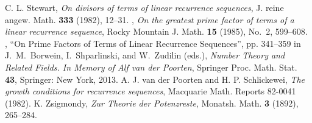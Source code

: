 \documentclass[reqno]{amsart}
\theoremstyle{remark}
\begin{document}
\begin{thebibliography}{99}
%
 C. L. Stewart, \textit{On divisors of terms of linear recurrence sequences}, J. reine angew. Math. \textbf{333} (1982), 12--31.
%
 \bysame, \textit{On the greatest prime factor of terms of a linear recurrence sequence}, Rocky Mountain J. Math. \textbf{15} (1985), No.~2, 599--608.
%
 \bysame, ``On Prime Factors of Terms of Linear Recurrence Sequences'', pp. 341--359 in J.~M.~Borwein, I.~Shparlinski, and W.~Zudilin (eds.), \textit{Number Theory and Related Fields. In Memory of Alf van der Poorten}, Springer Proc. Math. Stat. \textbf{43}, Springer: New York, 2013.
%
 A. J. van der Poorten and H. P. Schlickewei, \textit{The growth conditions for recurrence sequences}, Macquarie Math. Reports 82-0041 (1982).
%
 K. Zsigmondy, \emph{Zur Theorie der Potenzreste}, Monatsh. Math. \textbf{3} (1892), 265--284.
%
\end{thebibliography}
%
\end{document}
